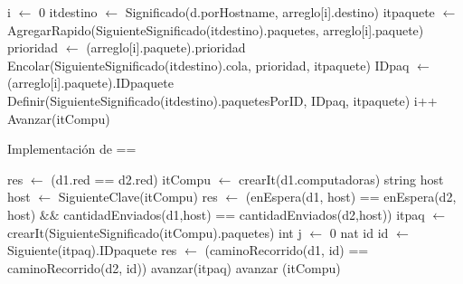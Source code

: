 \begin{Algoritmos}
\begin{algorithm}
\begin{algorithmic}[0]
	
	\State {}
	\State i $\gets$ 0
	 	
			\State itdestino $\gets$ Significado(d.porHostname, arreglo[i].destino) 
			\State itpaquete $\gets$ AgregarRapido(SiguienteSignificado(itdestino).paquetes, arreglo[i].paquete) 
			\State {}
			\State prioridad $\gets$ (arreglo[i].paquete).prioridad
			\State Encolar(SiguienteSignificado(itdestino).cola, prioridad, itpaquete) 
			\State IDpaq $\gets$ (arreglo[i].paquete).IDpaquete 		
			\State Definir(SiguienteSignificado(itdestino).paquetesPorID, IDpaq, itpaquete) 
		\EndIf
	\State i++
	\State Avanzar(itCompu)
	\EndWhile
	
\EndFunction
\end{algorithmic}
\end{algorithm}

\begin{algorithm}
\caption{Implementaci\'on de ==}
\begin{algorithmic}[0]
	\State res $\gets$ (d1.red == d2.red)						
	 													
		\State itCompu $\gets$ crearIt(d1.computadoras)  		
		\State string host 										
			
			\State host $\gets$ SiguienteClave(itCompu)			 
			\State res $\gets$ (enEspera(d1, host) == enEspera(d2, host) $\&\&$ \newline  cantidadEnviados(d1,host) == cantidadEnviados(d2,host))  
			\State itpaq $\gets$ crearIt(SiguienteSignificado(itCompu).paquetes) 
			\State int j $\gets$ 0												
			\State nat id														
				
				\State id $\gets$ Siguiente(itpaq).IDpaquete 					
				\State res $\gets$ (caminoRecorrido(d1, id) == caminoRecorrido(d2, id)) 
				\State avanzar(itpaq)											
			\EndWhile
		\State avanzar (itCompu)													
		\EndWhile
	\EndIf
\EndFunction
\end{algorithmic}
\end{algorithm}

\end{Algoritmos}

\clearpage


